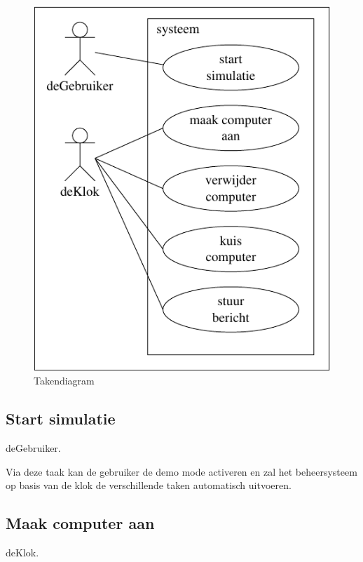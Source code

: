 \documentclass[a4paper,oneside]{report}
\begin{document}
\begin{figure}[h!]
\begin{center}

\includegraphics[scale=0.75]{taken_diagram2}

\caption{Takendiagram}
\end{center}
\end{figure}

\newpage

\subsection{Start simulatie}
deGebruiker.

Via deze taak kan de gebruiker de demo mode activeren en zal het beheersysteem op basis van de klok de verschillende taken automatisch uitvoeren.


\newpage
\subsection{Maak computer aan}
deKlok.
\end{document}
